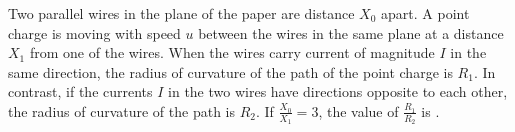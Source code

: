
    \item Two parallel wires in the plane of the paper are distance \(X_0\) apart. A point charge is moving with speed \(u\) between the wires in the same plane at a distance \(X_1\) from one of the wires. When the wires carry current of magnitude \(I\) in the same direction, the radius of curvature of the path of the point charge is \(R_1\). In contrast, if the currents \(I\) in the two wires have directions opposite to each other, the radius of curvature of the path is \(R_2\). If \(\frac{X_0}{X_1} = 3\), the value of \(\frac{R_1}{R_2}\) is \underline{\hspace{2.5 cm}}.
